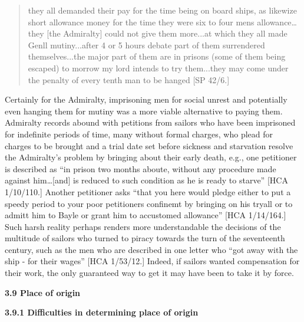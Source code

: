 \begin{quotation}
they all demanded their pay for the time being on board ships, as likewize short allowance money for the time they were six to four mens allowance… they [the Admiralty] could not give them more...at which they all made Genll mutiny...after 4 or 5 hours debate part of them surrendered themselves...the major part of them are in prisons (some of them being escaped) to morrow my lord intends to try them...they may come under the penalty of every tenth man to be hanged [SP 42/6.]

\end{quotation}
\begin{styleStandard}
Certainly for the Admiralty, imprisoning men for social unrest and potentially even hanging them for mutiny was a more viable alternative to paying them. Admiralty records abound with petitions from sailors who have been imprisoned for indefinite periods of time, many without formal charges, who plead for charges to be brought and a trial date set before sickness and starvation resolve the Admiralty’s problem by bringing about their early death, e.g., one petitioner is described as “in prison two months aboute, without any procedure made against him…[and] is reduced to such condition as he is ready to starve” [HCA 1/10/110.] Another petitioner asks “that you here would pledge either to put a speedy period to your poor petitioners confinemt by bringing on his tryall or to admitt him to Bayle or grant him to accustomed allowance” [HCA 1/14/164.] Such harsh reality perhaps renders more understandable the decisions of the multitude of sailors who turned to piracy towards the turn of the seventeenth century, such as the men who are described in one letter who “got away with the ship - for their wages” [HCA 1/53/12.] Indeed, if sailors wanted compensation for their work, the only guaranteed way to get it may have been to take it by force. 
\end{styleStandard}


\begin{styleStandard}
\textbf{3.9 Place of origin }
\end{styleStandard}


\begin{styleNormali}
\textbf{3.9.1 Difficulties in determining place of origin}
\end{styleNormali}


